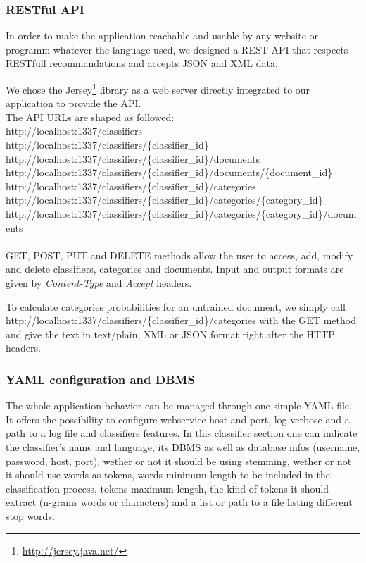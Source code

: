 \documentclass[a4paper,11pt]{article}
\begin{document}
\subsubsection{RESTful API}

In order to make the application reachable and usable by any website or
programm whatever the language used, we designed a REST API that respects
RESTfull recommandations and accepts JSON and XML data.

We chose the Jersey\footnote{\url{http://jersey.java.net/}} library as a
web server directly integrated to our application to provide the API.
~\\

The API URLs are shaped as followed:\\
http://localhost:1337/classifiers \\
http://localhost:1337/classifiers/\{classifier\_id\} \\
http://localhost:1337/classifiers/\{classifier\_id\}/documents \\
http://localhost:1337/classifiers/\{classifier\_id\}/documents/\{document\_id\} \\
http://localhost:1337/classifiers/\{classifier\_id\}/categories \\
http://localhost:1337/classifiers/\{classifier\_id\}/categories/\{category\_id\} \\
http://localhost:1337/classifiers/\{classifier\_id\}/categories/\{category\_id\}/documents \\
~\\

GET, POST, PUT and DELETE methods allow the user to access, add, modify and
delete classifiers, categories and documents. Input and output formats are
given by \textit{Content-Type} and
\textit{Accept} headers.

To calculate categories probabilities for an untrained document, we simply
call http://localhost:1337/classifiers/\{classifier\_id\}/categories with the
GET method and give the text in text/plain, XML or JSON format right after the
HTTP headers.

\subsubsection{YAML configuration and DBMS}

The whole application behavior can be managed through one simple YAML file.
It offers the possibility to configure webservice host and port, log verbose
and a path to a log file and classifiers features. In this classifier section
one can indicate the classifier's name and language, its DBMS as well as
database infos (username, password, host, port), wether or not it should be
using stemming, wether or not it should use words as tokens,  words minimum
length to be included in the classification process, tokens maximum length,
the kind of tokens it should extract (n-grams words or characters) and a list
or path to a file listing different stop words.
\end{document}
